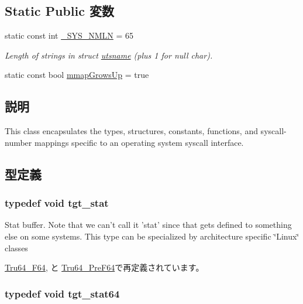 \subsection*{Static Public 変数}
\begin{DoxyCompactItemize}
\item 
static const int \hyperlink{classOperatingSystem_a1a19d4c9718c9a4ad5fa2e48271fccc9}{\_\-SYS\_\-NMLN} = 65
\begin{DoxyCompactList}\small\item\em Length of strings in struct \hyperlink{structOperatingSystem_1_1utsname}{utsname} (plus 1 for null char). \item\end{DoxyCompactList}\item 
static const bool \hyperlink{classOperatingSystem_a913e273b1e48eb022f86828d53a16f7c}{mmapGrowsUp} = true
\end{DoxyCompactItemize}


\subsection{説明}
This class encapsulates the types, structures, constants, functions, and syscall-\/number mappings specific to an operating system syscall interface. 

\subsection{型定義}
\hypertarget{classOperatingSystem_a2b1f8be68cdf9781efbaf6e9cdbd8d02}{
\subsubsection[{tgt\_\-stat}]{\setlength{\rightskip}{0pt plus 5cm}typedef void {\bf tgt\_\-stat}}}
\label{classOperatingSystem_a2b1f8be68cdf9781efbaf6e9cdbd8d02}
Stat buffer. Note that we can't call it 'stat' since that gets defined to something else on some systems. This type can be specialized by architecture specific \char`\"{}Linux\char`\"{} classes 

\hyperlink{classTru64__F64_ae57fa534da0197e5bb73fbc40bd59a08}{Tru64\_\-F64}, と \hyperlink{classTru64__PreF64_a704fbfa7adb0a1c876af25fc5367ccac}{Tru64\_\-PreF64}で再定義されています。\hypertarget{classOperatingSystem_af8d98b8c56085b677de8e0c66eed9d6b}{
\subsubsection[{tgt\_\-stat64}]{\setlength{\rightskip}{0pt plus 5cm}typedef void {\bf tgt\_\-stat64}}}
\label{classOperatingSystem_af8d98b8c56085b677de8e0c66eed9d6b}


